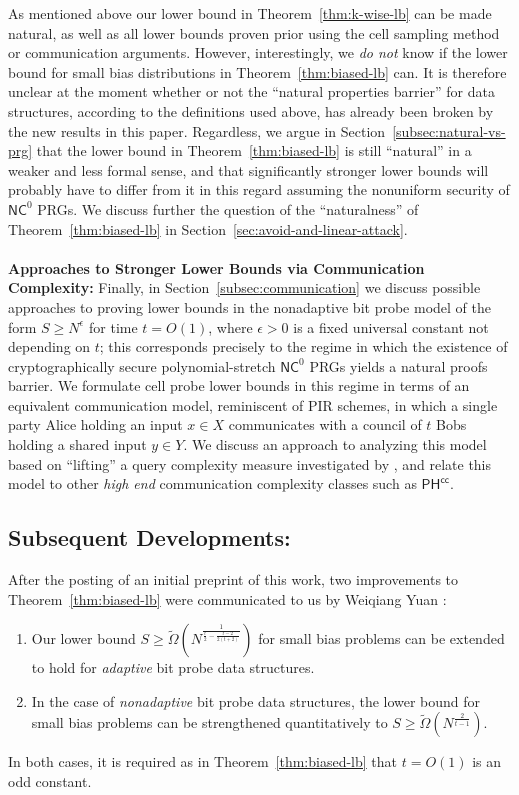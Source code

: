 \documentclass[11pt]{article}
\begin{document}
As mentioned above our lower bound in Theorem~\ref{thm:k-wise-lb} can be made natural, as well as all lower bounds proven prior using the cell sampling method or communication arguments. However, interestingly, we \emph{do not} know if the lower bound for small bias distributions in Theorem~\ref{thm:biased-lb} can. 
It is therefore unclear at the moment whether or not the ``natural properties barrier'' for data structures, according to the definitions used above, has already been broken by the new results in this paper. 
Regardless, we argue in Section~\ref{subsec:natural-vs-prg} that the lower bound in Theorem~\ref{thm:biased-lb} is still ``natural'' in a weaker and less formal sense, and that significantly stronger lower bounds will probably have to differ from it in this regard assuming the nonuniform security of $\mathsf{NC}^0$ PRGs.
We discuss further the question of the ``naturalness'' of Theorem~\ref{thm:biased-lb} in Section~\ref{sec:avoid-and-linear-attack}.
~\\~\\
{\bf \noindent Approaches to Stronger Lower Bounds via Communication Complexity:}
Finally, in Section~\ref{subsec:communication} we discuss possible approaches to proving lower bounds in the nonadaptive bit probe model of the form $S \geq N^{\epsilon}$ for time $t=O(1)$, where $\epsilon>0$ is a fixed universal constant not depending on $t$; this corresponds precisely to the regime in which the existence of cryptographically secure polynomial-stretch $\mathsf{NC}^0$ PRGs yields a natural proofs barrier. We formulate cell probe lower bounds in this regime in terms of an equivalent communication model, reminiscent of PIR schemes, in which a single party Alice holding an input $x \in X$ communicates with a council of $t$ Bobs holding a shared input $y \in Y$. We discuss an approach to analyzing this model based on ``lifting'' a query complexity measure investigated by \cite{hrubes-rao,lecomte2022composition}, and relate this model to other \emph{high end} communication complexity classes such as $\mathsf{PH^{cc}}$.

\subsection{Subsequent Developments:}
After the posting of an initial preprint of this work, two improvements to Theorem~\ref{thm:biased-lb} were communicated to us by Weiqiang Yuan \cite{weiqiang}:
\begin{enumerate}
    \item Our lower bound $S \geq \tilde{\Omega}(N^{\frac{1}{\frac{t}{2} - \frac{t-2}{2(t+2)}}})$ for small bias problems can be extended to hold for \emph{adaptive} bit probe data structures.
    \item In the case of \emph{nonadaptive} bit probe data structures, the lower bound for small bias problems can be strengthened quantitatively to $S \geq \tilde{\Omega}(N^{\frac{2}{t-1}})$. 
\end{enumerate}
In both cases, it is required as in Theorem~\ref{thm:biased-lb} that $t=O(1)$ is an odd constant.
\end{document}
